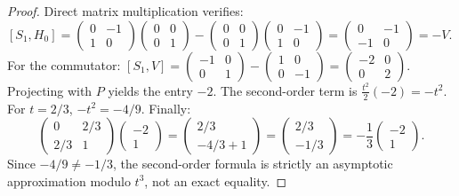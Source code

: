 \begin{proof}
Direct matrix multiplication verifies:
$[S_1, H_0] = \begin{pmatrix} 0 & -1 \\ 1 & 0 \end{pmatrix} \begin{pmatrix} 0 & 0 \\ 0 & 1 \end{pmatrix} - \begin{pmatrix} 0 & 0 \\ 0 & 1 \end{pmatrix} \begin{pmatrix} 0 & -1 \\ 1 & 0 \end{pmatrix} = \begin{pmatrix} 0 & -1 \\ -1 & 0 \end{pmatrix} = -V$.
For the commutator: $[S_1, V] = \begin{pmatrix} -1 & 0 \\ 0 & 1 \end{pmatrix} - \begin{pmatrix} 1 & 0 \\ 0 & -1 \end{pmatrix} = \begin{pmatrix} -2 & 0 \\ 0 & 2 \end{pmatrix}$.
Projecting with $P$ yields the entry $-2$. The second-order term is $\frac{t^2}{2}(-2) = -t^2$. For $t = 2/3$, $-t^2 = -4/9$.
Finally:
\[
\begin{pmatrix} 0 & 2/3 \\ 2/3 & 1 \end{pmatrix} \begin{pmatrix} -2 \\ 1 \end{pmatrix} = \begin{pmatrix} 2/3 \\ -4/3 + 1 \end{pmatrix} = \begin{pmatrix} 2/3 \\ -1/3 \end{pmatrix} = -\frac{1}{3} \begin{pmatrix} -2 \\ 1 \end{pmatrix}.
\]
Since $-4/9 \neq -1/3$, the second-order formula is strictly an asymptotic approximation modulo $t^3$, not an exact equality.
\end{proof}

